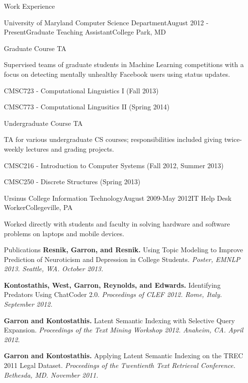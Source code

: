 \documentclass{resume} %
\begin{document}
\begin{rSection}{Work Experience}
\begin{rSubsection}{University of Maryland Computer Science Department}{August 2012 - Present}{Graduate Teaching Assistant}{College Park, MD}
\item
\begin{rWorkProject}{Graduate Course TA}
\item Supervised teams of graduate students in Machine Learning competitions with a focus on detecting mentally unhealthy Facebook users using status updates.
\item CMSC723 - Computational Linguistics I (Fall 2013)
\item CMSC773 - Computational Lingusitics II (Spring 2014)
\end{rWorkProject}
\item
\begin{rWorkProject}{Undergraduate Course TA}
\item TA for various undergraduate CS courses; responsibilities included giving twice-weekly lectures and grading projects.
\item CMSC216 - Introduction to Computer Systems (Fall 2012, Summer 2013)
\item CMSC250 - Discrete Structures (Spring 2013)
\end{rWorkProject}
\end{rSubsection}

\begin{rSubsection}{Ursinus College Information Technology}{August 2009-May 2012}{IT Help Desk Worker}{Collegeville, PA}
\item Worked directly with students and faculty in solving hardware and software problems on laptops and mobile devices. 
\end{rSubsection}
\end{rSection}



\begin{rSection}{Publications}
\textbf{Resnik, Garron, and Resnik.} Using Topic Modeling to Improve Prediction of Neuroticism and Depression in College Students. \textit{Poster, EMNLP 2013. Seattle, WA. October 2013.}
\item \textbf{Kontostathis, West, Garron, Reynolds, and Edwards.} Identifying Predators Using ChatCoder 2.0. \textit{Proceedings of CLEF 2012. Rome, Italy. September 2012.}
\item \textbf{Garron and Kontostathis.} Latent Semantic Indexing with Selective Query Expansion. \textit{Proceedings of the Text Mining Workshop 2012. Anaheim, CA. April 2012.}
\item \textbf{Garron and Kontostathis.} Applying Latent Semantic Indexing on the TREC 2011 Legal Dataset. \textit{Proceedings of the Twentienth Text Retrieval Conference. Bethesda, MD. November 2011.}
\end{rSection}
\end{document}
